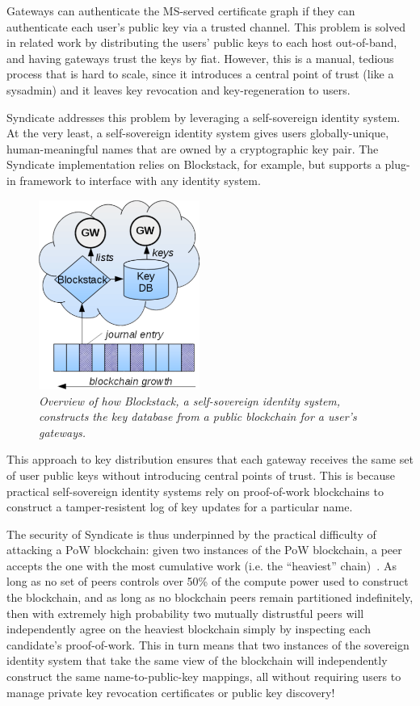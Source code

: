 Gateways can authenticate the MS-served certificate graph if they can
authenticate each user's public key via a trusted channel. This problem is
solved in related work by distributing the users' public keys to
each host out-of-band, and having gateways trust the keys by fiat. However, this
is a manual, tedious process that is hard to scale, since it introduces a
central point of trust (like a sysadmin) and it leaves key revocation and
key-regeneration to users.

Syndicate addresses this problem by leveraging a self-sovereign identity system.
At the very least, a self-sovereign identity system gives users globally-unique, human-meaningful
names that are owned by a cryptographic key pair.  The Syndicate implementation
relies on Blockstack, for example, but supports a plug-in framework to interface
with any identity system.


\begin{figure}[t!]
\centering
\includegraphics[width=0.47\textwidth]{figures/blockstack-overview}
\caption{\it
Overview of how Blockstack, a self-sovereign identity system, constructs the key database from a public blockchain
for a user's gateways.
   }
\label{fig:cert-graph}
\end{figure}

This approach to key distribution ensures that each gateway receives the same
set of user public keys without introducing central points of trust. This is
because practical self-sovereign identity systems rely on proof-of-work
blockchains to construct a tamper-resistent log of key updates for a particular
name.

The security of Syndicate is thus underpinned by the practical difficulty of attacking a
PoW blockchain: given two instances of the PoW blockchain,
a peer accepts the one with the most cumulative work (i.e. the
``heaviest'' chain)~\cite{bitcoin-textbook}. As long as no set of peers controls over 50\% of the
compute power used to construct the blockchain, and as long as no blockchain
peers remain partitioned indefinitely, then with extremely high probability two
mutually distrustful peers will independently agree on the heaviest blockchain
simply by inspecting each candidate's proof-of-work.  This in turn means
that two instances of the sovereign identity system that take the same view of
the blockchain will independently construct the same name-to-public-key
mappings, all without requiring users to manage private key revocation
certificates or public key discovery!

